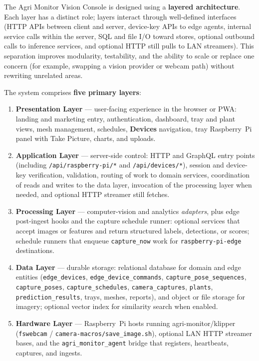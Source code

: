 \label{sec:overview}

The Agri Monitor Vision Console is designed using a \textbf{layered architecture}. Each layer has a distinct role; layers interact through well-defined interfaces (HTTP APIs between client and server, device-key APIs to edge agents, internal service calls within the server, SQL and file I/O toward stores, optional outbound calls to inference services, and optional HTTP still pulls to LAN streamers). This separation improves modularity, testability, and the ability to scale or replace one concern (for example, swapping a vision provider or webcam path) without rewriting unrelated areas.

The system comprises \textbf{five primary layers}:

\begin{enumerate}
  \item \textbf{Presentation Layer} — user-facing experience in the browser or PWA: landing and marketing entry, authentication, dashboard, tray and plant views, mesh management, schedules, \textbf{Devices} navigation, tray Raspberry~Pi panel with Take Picture, charts, and uploads.
  \item \textbf{Application Layer} — server-side control: HTTP and GraphQL entry points (including \texttt{/api/raspberry-pi/*} and \texttt{/api/devices/*}), session and device-key verification, validation, routing of work to domain services, coordination of reads and writes to the data layer, invocation of the processing layer when needed, and optional HTTP streamer still fetches.
  \item \textbf{Processing Layer} — computer-vision and analytics \emph{adapters}, plus edge post-ingest hooks and the capture schedule runner: optional services that accept images or features and return structured labels, detections, or scores; schedule runners that enqueue \texttt{capture\_now} work for \texttt{raspberry-pi-edge} destinations.
  \item \textbf{Data Layer} — durable storage: relational database for domain and edge entities (\texttt{edge\_devices}, \texttt{edge\_device\_commands}, \texttt{capture\_pose\_sequences}, \texttt{capture\_poses}, \texttt{capture\_schedules}, \texttt{camera\_captures}, \texttt{plants}, \texttt{prediction\_results}, trays, meshes, reports), and object or file storage for imagery; optional vector index for similarity search when enabled.
  \item \textbf{Hardware Layer} — Raspberry~Pi hosts running agri-monitor/klipper (\texttt{fswebcam} / \texttt{camera-macros/save\_image.sh}), optional LAN HTTP streamer bases, and the \texttt{agri\_monitor\_agent} bridge that registers, heartbeats, captures, and ingests.
\end{enumerate}


